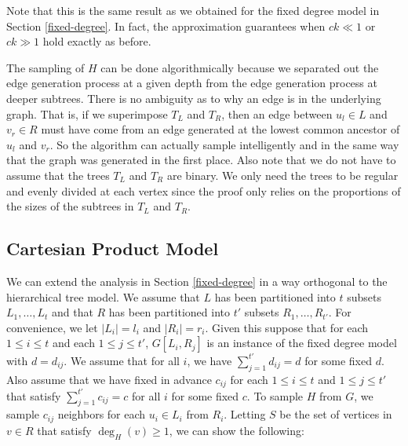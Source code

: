 Note that this is the same result as we obtained for the fixed degree
model in Section \ref{fixed-degree}. In fact, the approximation
guarantees when $ck \ll 1$ or $ck \gg 1$ hold exactly as before.\vs

The sampling of $H$ can be done algorithmically because we separated
out the edge generation process at a given depth from the edge
generation process at deeper subtrees. There is no ambiguity as to why
an edge is in the underlying graph. That is, if we superimpose $T_L$
and $T_R$, then an edge between $u_l\in L$ and $v_r\in R$ must have
come from an edge generated at the lowest common ancestor of $u_l$ and
$v_r$. So the algorithm can actually sample intelligently and in the
same way that the graph was generated in the first place. Also note
that we do not have to assume that the trees $T_L$ and $T_R$ are
binary. We only need the trees to be regular and evenly divided at
each vertex since the proof only relies on the proportions of the
sizes of the subtrees in $T_L$ and $T_R$.


\subsection{Cartesian Product Model}
\label{cartesian}
We can extend the analysis in Section \ref{fixed-degree} in a way
orthogonal to the hierarchical tree model. We assume that
$L$ has been partitioned into $t$ subsets $L_1,\ldots, L_t$ and
that $R$ has been partitioned into $t'$ subsets $R_1,\ldots,
R_{t'}$. For convenience, we let $|L_i| = l_i$ and $|R_i|=r_i$. Given
this suppose that for each $1\leq i\leq t$ and each $1\leq j\leq t'$,
$G[L_i, R_j]$ is an instance of the fixed degree model with
$d=d_{ij}$. We assume that for all $i$, we have $\sum_{j=1}^{t'}
d_{ij} = d$ for some fixed $d$. Also assume that we have fixed in
advance $c_{ij}$ for each $1\leq i\leq t$ and $1\leq j\leq t'$ that
satisfy $\sum_{j=1}^{t'} c_{ij} = c$ for all $i$ for some fixed $c$.
To sample $H$ from $G$, we sample $c_{ij}$ neighbors for each 
$u_i\in L_i$ from $R_i$. Letting $S$ be the set of vertices in 
$v\in R$ that satisfy $\deg_H(v)\geq 1$, we can show the following:

